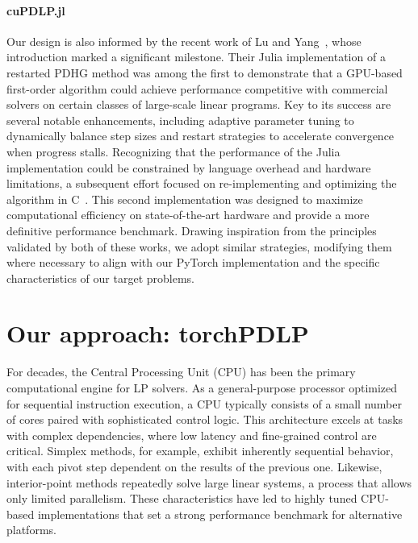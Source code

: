 \documentclass[twoside,12pt,openright]{report}  %
\begin{document}
\paragraph{cuPDLP.jl}
Our design is also informed by the recent work of Lu and Yang~\cite{lu2023cupdlp}, whose introduction marked a significant milestone. Their Julia implementation of a restarted PDHG method was among the first to demonstrate that a GPU-based first-order algorithm could achieve performance competitive with commercial solvers on certain classes of large-scale linear programs. Key to its success are several notable enhancements, including adaptive parameter tuning to dynamically balance step sizes and restart strategies to accelerate convergence when progress stalls. Recognizing that the performance of the Julia implementation could be constrained by language overhead and hardware limitations, a subsequent effort focused on re-implementing and optimizing the algorithm in C~\cite{lu2023cupdlp-c}. This second implementation was designed to maximize computational efficiency on state-of-the-art hardware and provide a more definitive performance benchmark. Drawing inspiration from the principles validated by both of these works, we adopt similar strategies, modifying them where necessary to align with our PyTorch implementation and the specific characteristics of our target problems.

\section{Our approach: torchPDLP}\label{sec: torchPDLP}
For decades, the Central Processing Unit (CPU) has been the primary computational engine for LP solvers. As a general-purpose processor optimized for sequential instruction execution, a CPU typically consists of a small number of cores paired with sophisticated control logic. This architecture excels at tasks with complex dependencies, where low latency and fine-grained control are critical. Simplex methods, for example, exhibit inherently sequential behavior, with each pivot step dependent on the results of the previous one. Likewise, interior-point methods repeatedly solve large linear systems, a process that allows only limited parallelism. These characteristics have led to highly tuned CPU-based implementations that set a strong performance benchmark for alternative platforms.

\end{document}
